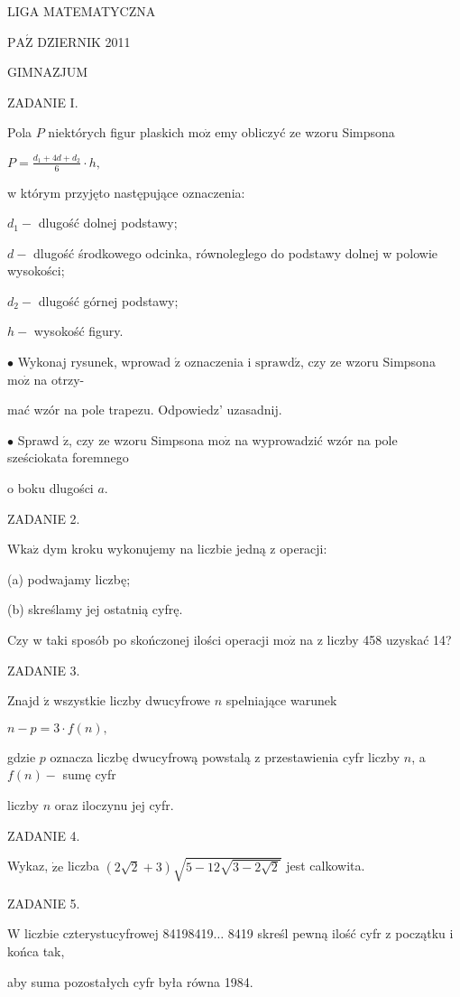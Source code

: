 \documentclass[a4paper,12pt]{article}
\begin{document}
LIGA MATEMATYCZNA

$\mathrm{P}\mathrm{A}\acute{\mathrm{Z}}$ DZIERNIK 2011

GIMNAZJUM

ZADANIE I.

Pola $P$ niektórych figur plaskich $\mathrm{m}\mathrm{o}\dot{\mathrm{z}}$ emy obliczyć ze wzoru Simpsona

$P=\displaystyle \frac{d_{1}+4d+d_{2}}{6}\cdot h,$

w którym przyjęto następujące oznaczenia:

$d_{1}-$ dlugość dolnej podstawy;

$d-$ dlugość środkowego odcinka, równoleglego do podstawy dolnej w polowie wysokości;

$d_{2}-$ dlugość górnej podstawy;

$h-$ wysokość figury.

$\bullet$ Wykonaj rysunek, wprowad $\acute{\mathrm{z}}$ oznaczenia i $\mathrm{s}\mathrm{p}\mathrm{r}\mathrm{a}\mathrm{w}\mathrm{d}\acute{\mathrm{z}}$, czy ze wzoru Simpsona $\mathrm{m}\mathrm{o}\dot{\mathrm{z}}$ na otrzy-

mać wzór na pole trapezu. Odpowiedz' uzasadnij.

$\bullet$ Sprawd $\acute{\mathrm{z}}$, czy ze wzoru Simpsona $\mathrm{m}\mathrm{o}\dot{\mathrm{z}}$ na wyprowadzić wzór na pole sześciokata foremnego

o boku dlugości $a.$

ZADANIE 2.

$\mathrm{W}\mathrm{k}\mathrm{a}\dot{\mathrm{z}}$ dym kroku wykonujemy na liczbie jedną z operacji:

(a) podwajamy liczbę;

(b) skreślamy jej ostatnią cyfrę.

Czy w taki sposób po skończonej ilości operacji $\mathrm{m}\mathrm{o}\dot{\mathrm{z}}$ na z liczby 458 uzyskać 14?

ZADANIE 3.

Znajd $\acute{\mathrm{z}}$ wszystkie liczby dwucyfrowe $n$ spelniające warunek

$n-p=3\cdot f(n),$

gdzie $p$ oznacza liczbę dwucyfrową powstalą z przestawienia cyfr liczby $n$, a $f(n)-$ sumę cyfr

liczby $n$ oraz iloczynu jej cyfr.

ZADANIE 4.

Wykaz, $\dot{\mathrm{z}}\mathrm{e}$ liczba $(2\sqrt{2}+3)\sqrt{5-12\sqrt{3-2\sqrt{2}}}$ jest calkowita.

ZADANIE 5.

$\mathrm{W}$ liczbie czterystucyfrowej 84198419$\ldots$ 8419 skreśl pewną ilość cyfr z początku i końca tak,

aby suma pozostałych cyfr była równa 1984.
\end{document}
